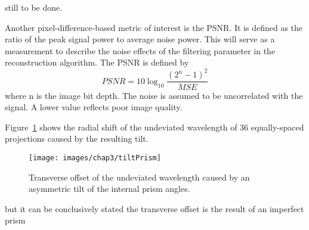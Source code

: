still to be done.

Another pixel-difference-based metric of interest is the \ac{PSNR}. It is defined as the ratio of the peak signal power to average noise power. This will serve as a measurement to describe the noise effects of the filtering parameter in the reconstruction algorithm. The PSNR is defined by
\begin{equation}
\label{eq:PSNR}
PSNR = 10 \log_{10} {\frac{(2^n-1)^2}{MSE}}
\end{equation}
where n is the image bit depth. The noise is assumed to be uncorrelated with the signal. A lower value reflects poor image quality.

Figure~\ref{fig:tiltPrism} shows the radial shift of the undeviated wavelength of 36 equally-spaced projections caused by the resulting tilt.

\begin{figure}[htb]
\begin{center}
\texttt{[image: images/chap3/tiltPrism]}
\caption{Transverse offset of the undeviated wavelength caused by an asymmetric tilt of the internal prism angles.}
\label{fig:tiltPrism}
\end{center}
\end{figure}

 but it can be conclusively stated the transverse offset is the result of an imperfect prism

